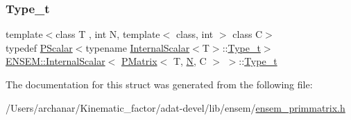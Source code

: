 \mbox{\label{structENSEM_1_1InternalScalar_3_01PMatrix_3_01T_00_01N_00_01C_01_4_01_4_a8f6d0ab798cf3ec250a72a2bc706c676}} 
\subsubsection{\texorpdfstring{Type\_t}{Type\_t}\hspace{0.1cm}{\footnotesize\ttfamily [3/3]}}
{\footnotesize\ttfamily template$<$class T , int N, template$<$ class, int $>$ class C$>$ \\
typedef \mbox{\hyperlink{classENSEM_1_1PScalar}{P\+Scalar}}$<$typename \mbox{\hyperlink{structENSEM_1_1InternalScalar}{Internal\+Scalar}}$<$T$>$\+::\mbox{\hyperlink{structENSEM_1_1InternalScalar_3_01PMatrix_3_01T_00_01N_00_01C_01_4_01_4_a8f6d0ab798cf3ec250a72a2bc706c676}{Type\+\_\+t}}$>$ \mbox{\hyperlink{structENSEM_1_1InternalScalar}{E\+N\+S\+E\+M\+::\+Internal\+Scalar}}$<$ \mbox{\hyperlink{classENSEM_1_1PMatrix}{P\+Matrix}}$<$ T, \mbox{\hyperlink{adat__devel_2lib_2hadron_2operator__name__util_8cc_a7722c8ecbb62d99aee7ce68b1752f337}{N}}, C $>$ $>$\+::\mbox{\hyperlink{structENSEM_1_1InternalScalar_3_01PMatrix_3_01T_00_01N_00_01C_01_4_01_4_a8f6d0ab798cf3ec250a72a2bc706c676}{Type\+\_\+t}}}



The documentation for this struct was generated from the following file\+:\begin{DoxyCompactItemize}
\item 
/\+Users/archanar/\+Kinematic\+\_\+factor/adat-\/devel/lib/ensem/\mbox{\hyperlink{adat-devel_2lib_2ensem_2ensem__primmatrix_8h}{ensem\+\_\+primmatrix.\+h}}\end{DoxyCompactItemize}
